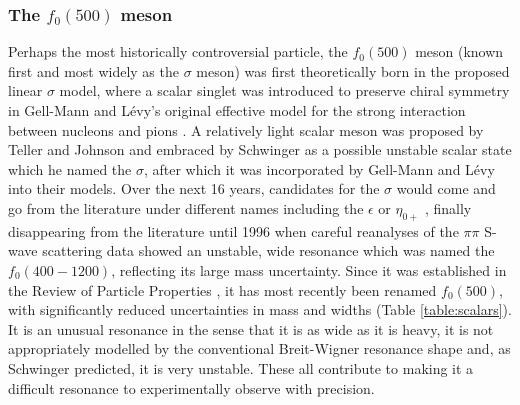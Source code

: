\documentclass[aps,prd,onecolumn,showpacs,amsmath,amssymb,nofootinbib]{revtex4} \pdfoutput=1
\newcommand{\gev}{\mathrm{GeV}}
\begin{document}
\subsubsection{The $f_0(500)$ meson}
Perhaps the most historically controversial particle, the $f_0(500)$ meson (known first and most widely as the $\sigma$ meson) was first theoretically born in the proposed linear $\sigma$ model, where a scalar singlet was introduced to preserve chiral symmetry in Gell-Mann and L\'evy's original effective model for the strong interaction between nucleons and pions \cite{GellMann1960}. A relatively light scalar meson was proposed by Teller and Johnson \cite{Teller1955} and embraced by Schwinger \cite{Schwinger1957} as a possible unstable scalar state which he named the $\sigma$, after which it was incorporated by Gell-Mann and L\'evy into their models. Over the next 16 years, candidates for the $\sigma$ would come and go from the literature under different names including the $\epsilon$ or $\eta_{0+}$ \cite{Pelaez2011}, finally disappearing from the literature until 1996 \cite{Tornqvist1996} when careful reanalyses of the $\pi\pi$ S-wave scattering data showed an unstable, wide resonance which was named the $f_0(400-1200)$, reflecting its large mass uncertainty\cite{Pelaez2011}. Since it was established in the Review of Particle Properties \cite{Barnett1996}, it has most recently been renamed $f_0(500)$, with significantly reduced uncertainties in mass and widths (Table \ref{table:scalars}). It is an unusual resonance in the sense that it is as wide as it is heavy, it is not appropriately modelled by the conventional Breit-Wigner resonance shape and, as Schwinger predicted, it is very unstable. These all contribute to making it a difficult resonance to experimentally observe with precision. 


\end{document}
